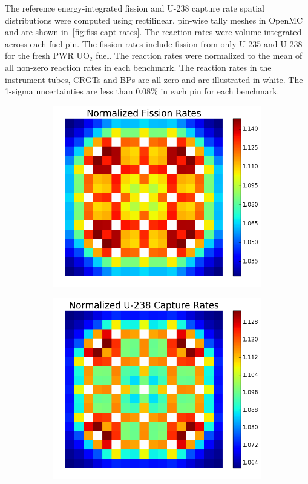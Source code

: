 The reference energy-integrated fission and U-238 capture rate spatial distributions were computed using rectilinear, pin-wise tally meshes in OpenMC and are shown in~\autoref{fig:fiss-capt-rates}. The reaction rates were volume-integrated across each fuel pin. The fission rates include fission from only U-235 and U-238 for the fresh PWR UO$_2$ fuel. The reaction rates were normalized to the mean of all non-zero reaction rates in each benchmark. The reaction rates in the instrument tubes, CRGTs and BPs are all zero and are illustrated in white. The 1-sigma uncertainties are less than 0.08\% in each pin for each benchmark.

\begin{figure}[h!]
\centering
\begin{subfigure}{0.45\textwidth}
  \includegraphics[width=\linewidth]{figures/assembly/fission-rates}
  \caption{}
  \label{fig:fiss-assm}
\end{subfigure}%
\begin{subfigure}{0.45\textwidth}
  \includegraphics[width=\linewidth]{figures/assembly/capture-rates}

\end{subfigure}
\end{figure}
